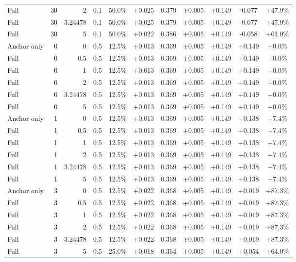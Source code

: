 \begin{table}[htbp]
\begin{tabular}{lrrrccccccc}
Full & 30 & 2 & 0.1 & 50.0\% & +0.025 & 0.379 & +0.005 & +0.149 & -0.077 & +47.9\% \\
Full & 30 & 3.24478 & 0.1 & 50.0\% & +0.025 & 0.379 & +0.005 & +0.149 & -0.077 & +47.9\% \\
Full & 30 & 5 & 0.1 & 50.0\% & +0.022 & 0.386 & +0.005 & +0.149 & -0.058 & +61.0\% \\
Anchor only & 0 & 0 & 0.5 & 12.5\% & +0.013 & 0.369 & +0.005 & +0.149 & +0.149 & +0.0\% \\
Full & 0 & 0.5 & 0.5 & 12.5\% & +0.013 & 0.369 & +0.005 & +0.149 & +0.149 & +0.0\% \\
Full & 0 & 1 & 0.5 & 12.5\% & +0.013 & 0.369 & +0.005 & +0.149 & +0.149 & +0.0\% \\
Full & 0 & 2 & 0.5 & 12.5\% & +0.013 & 0.369 & +0.005 & +0.149 & +0.149 & +0.0\% \\
Full & 0 & 3.24478 & 0.5 & 12.5\% & +0.013 & 0.369 & +0.005 & +0.149 & +0.149 & +0.0\% \\
Full & 0 & 5 & 0.5 & 12.5\% & +0.013 & 0.369 & +0.005 & +0.149 & +0.149 & +0.0\% \\
Anchor only & 1 & 0 & 0.5 & 12.5\% & +0.013 & 0.369 & +0.005 & +0.149 & +0.138 & +7.4\% \\
Full & 1 & 0.5 & 0.5 & 12.5\% & +0.013 & 0.369 & +0.005 & +0.149 & +0.138 & +7.4\% \\
Full & 1 & 1 & 0.5 & 12.5\% & +0.013 & 0.369 & +0.005 & +0.149 & +0.138 & +7.4\% \\
Full & 1 & 2 & 0.5 & 12.5\% & +0.013 & 0.369 & +0.005 & +0.149 & +0.138 & +7.4\% \\
Full & 1 & 3.24478 & 0.5 & 12.5\% & +0.013 & 0.369 & +0.005 & +0.149 & +0.138 & +7.4\% \\
Full & 1 & 5 & 0.5 & 12.5\% & +0.013 & 0.369 & +0.005 & +0.149 & +0.138 & +7.4\% \\
Anchor only & 3 & 0 & 0.5 & 12.5\% & +0.022 & 0.368 & +0.005 & +0.149 & +0.019 & +87.3\% \\
Full & 3 & 0.5 & 0.5 & 12.5\% & +0.022 & 0.368 & +0.005 & +0.149 & +0.019 & +87.3\% \\
Full & 3 & 1 & 0.5 & 12.5\% & +0.022 & 0.368 & +0.005 & +0.149 & +0.019 & +87.3\% \\
Full & 3 & 2 & 0.5 & 12.5\% & +0.022 & 0.368 & +0.005 & +0.149 & +0.019 & +87.3\% \\
Full & 3 & 3.24478 & 0.5 & 12.5\% & +0.022 & 0.368 & +0.005 & +0.149 & +0.019 & +87.3\% \\
Full & 3 & 5 & 0.5 & 25.0\% & +0.018 & 0.364 & +0.005 & +0.149 & +0.054 & +64.0\% \\

\end{tabular}
\end{table}
